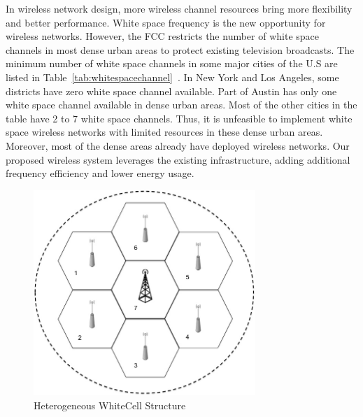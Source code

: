 In wireless network design, 
more wireless channel resources bring more flexibility and better performance.
White space frequency is the new opportunity for wireless networks. 
However, the FCC restricts the number of white space channels in most dense urban areas 
to protect existing television broadcasts. 
The minimum number of white space channels in some major cities of the U.S are listed in 
Table~\ref{tab:whitespacechannel}~\cite{googlespectrum}.
In New York and Los Angeles, some districts have zero white space channel available.
Part of Austin has only one white space channel available in dense urban areas.
Most of the other cities in the table have 2 to 7 white space channels.
Thus, it is unfeasible to implement white space wireless networks 
with limited resources in these dense urban areas.
Moreover, most of the dense areas already have deployed wireless networks. 
Our proposed wireless system leverages the existing infrastructure, adding additional
frequency efficiency and lower energy usage.

\begin{figure}
\vspace{-0.0in}
\centering
\includegraphics[width=84mm]{figures/whitecell}
\vspace{-0.1in}
\caption{Heterogeneous WhiteCell Structure}
\label{fig:systemmodel}
\vspace{-0.3in}
\end{figure}

